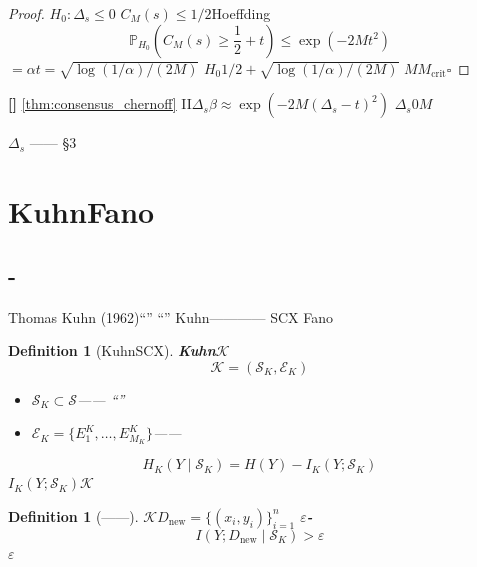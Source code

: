\documentclass[11pt,a4paper]{article}
\newtheorem{definition}[theorem]{Definition}
\theoremstyle{remark}
\newcommand{\honeststrike}{\textnormal{\textbf{[]}}}
\begin{document}
\begin{proof}
$H_0: \Delta_s \leq 0$
$C_M(s)$$\leq 1/2$Hoeffding
\begin{equation}
    \mathbb{P}_{H_0}\left(C_M(s) \geq \frac{1}{2} + t\right)
    \leq \exp(-2Mt^2)
\end{equation}
$= \alpha$$t = \sqrt{\log(1/\alpha)/(2M)}$
$H_0$$1/2 + \sqrt{\log(1/\alpha)/(2M)}$
$M$$M_{\text{crit}}$\hfill $\square$
\end{proof}

\honeststrike{} \textbf{}
\ref{thm:consensus_chernoff}
\textbf{}
II$\Delta_s$$\beta \approx \exp(-2M(\Delta_s - t)^2)$
$\Delta_s$0$M$

\textbf{}$\Delta_s$
——
\S3

\section{KuhnFano}

\subsection{-}

Thomas Kuhn (1962)\textit{}``''
``''
Kuhn————
SCX
Fano

\begin{definition}[KuhnSCX]
\label{def:paradigm}
\textbf{Kuhn}$\mathcal{K}$
\begin{equation}
    \boxed{\mathcal{K} = (\mathcal{S}_K, \mathcal{E}_K)}
\end{equation}

\begin{itemize}
    \item $\mathcal{S}_K \subset \mathcal{S}$——
          ``''
    \item $\mathcal{E}_K = \{E_1^K, \ldots, E_{M_K}^K\}$——
          
\end{itemize}
\textbf{}
\begin{equation}
    H_K(Y \mid \mathcal{S}_K) = H(Y) - I_K(Y; \mathcal{S}_K)
\end{equation}
$I_K(Y; \mathcal{S}_K)$$\mathcal{K}$
\end{definition}

\begin{definition}[——]
\label{def:anomaly}
$\mathcal{K}$$D_{\text{new}} = \{(x_i, y_i)\}_{i=1}^{n}$
\textbf{$\varepsilon$-}
\begin{equation}
    \boxed{I(Y; D_{\text{new}} \mid \mathcal{S}_K) > \varepsilon}
\end{equation}
$\varepsilon$\\
\textbf{}
\end{definition}
\end{document}

